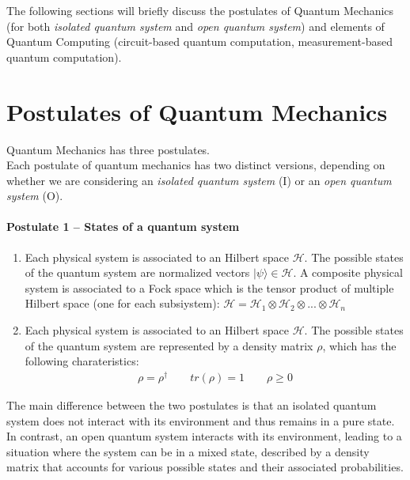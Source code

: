 The following sections will briefly discuss the postulates of Quantum Mechanics (for both \textit{isolated quantum system} and 
\textit{open quantum system}) and elements of Quantum Computing (circuit-based quantum computation, measurement-based quantum computation).

\section{Postulates of Quantum Mechanics}

Quantum Mechanics has three postulates.\\
Each postulate of quantum mechanics has two distinct versions, depending on whether we are considering an 
\textit{isolated quantum system} (I) or an \textit{open quantum system} (O).

\paragraph{Postulate 1 – States of a quantum system}
\begin{enumerate}
    \renewcommand{\labelenumi}{I)}
    \item Each physical system is associated to an Hilbert space $\mathcal{H}$. The possible states of the quantum system are 
    normalized vectors $|\psi \rangle \in \mathcal{H}$.
    A composite physical system is associated to a Fock space which is the tensor product of multiple Hilbert space (one for each subsiystem):
    $\mathcal{H} = \mathcal{H}_1 \otimes \mathcal{H}_2 \otimes ... \otimes \mathcal{H}_n$
    \renewcommand{\labelenumi}{O)}
    \item Each physical system is associated to an Hilbert space $\mathcal{H}$. 
    The possible states of the quantum system are represented by a density matrix $\rho$, which has the following charateristics:
    \begin{align}
        \rho = \rho^{\dagger}
        \qquad
        tr(\rho) = 1
        \qquad
        \rho \ge 0
    \end{align}
\end{enumerate}

The main difference between the two postulates is that an isolated quantum system does not interact with its environment and thus remains 
in a pure state. In contrast, an open quantum system interacts with its environment, leading to a situation where the system can be in a 
mixed state, described by a density matrix that accounts for various possible states and their associated probabilities.

